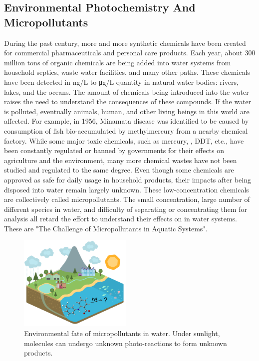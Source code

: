 \documentclass[
journal=jpcbfk, %
manuscript=article]{achemso}
\begin{document}
	\subsection{Environmental Photochemistry And Micropollutants}
	During the past century, more and more synthetic chemicals have been created for commercial pharmaceuticals and personal care products. Each year, about 300 million tons of organic chemicals are being added into water systems from household septics, waste water facilities, and many other paths.\cite{Schwarzenbach2006} These chemicals have been detected in ng/L to μg/L quantity in natural water bodies: rivers, lakes, and the oceans.\cite{Monteiro2010} The amount of chemicals being introduced into the water raises the need to understand the consequences of these compounds. If the water is polluted, eventually animals, human, and other living beings in this world are affected. For example, in 1956, Minamata disease was identified to be caused by consumption of fish bio-accumulated by methylmercury from a nearby chemical factory.\cite{Harada1995} While some major toxic chemicals, such as mercury, , DDT, etc., have been constantly regulated or banned by governments for their effects on agriculture and the environment, many more chemical wastes have not been studied and regulated to the same degree. Even though some chemicals are approved as safe for daily usage in household products, their impacts after being disposed into water remain largely unknown. These low-concentration chemicals are collectively called micropollutants.\cite{Schwarzenbach2006} The small concentration, large number of different species in water, and difficulty of separating or concentrating them for analysis all retard the effort to understand their effects on in water systems. These are "The Challenge of Micropollutants in Aquatic Systems".\cite{Schwarzenbach2006}
	\begin{figure}
		\centering	
		\includegraphics[width=0.48\textwidth]{images/waterCycleDiagram2_mod.pdf}
		\caption{Environmental fate of micropollutants in water. Under sunlight, molecules can undergo unknown photo-reactions to form unknown products.\cite{noodledoodle}}\label{fig:waterFluff}
		\vspace{-15pt}
	\end{figure}
\end{document}
